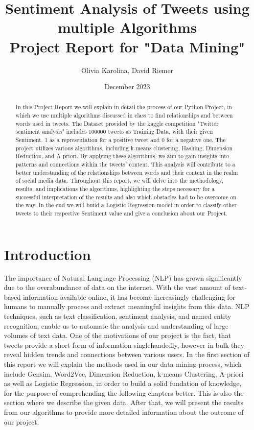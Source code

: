 \documentclass[11pt,a4paper]{article}
\title{Sentiment Analysis of Tweets using multiple Algorithms \\[0.5em] \large{Project Report for "Data Mining" \\[0.5em]} }
\author{Olivia Karolina, David Riemer}
\date{December 2023}
\begin{document}
\maketitle


\newpage
\begin{abstract}
In this Project Report we will explain in detail the process of our Python Project, in which we use multiple algorithms discussed in class to find relationships and between words used in tweets. The Dataset provided by the kaggle competition "Twitter sentiment analysis" includes 100000 tweets as Training Data, with their given Sentiment. 1 as a representation for a positive tweet and 0 for a negative one.
The project utilizes various algorithms, including k-means clustering, Hashing, Dimension Reduction, and A-priori. By applying these algorithms, we aim to gain insights into patterns and connections within the tweets' content. This analysis will contribute to a better understanding of the relationships between words and their context in the realm of social media data. 
Throughout this report, we will delve into the methodology, results, and implications the algorithms, highlighting the steps necessary for a successful interpretation of the results and also which obstacles had to be overcome on the way.
In the end we will build a Logistic Regression-model in order to classify other tweets to their respective Sentiment value and give a conclusion about our Project.
\end{abstract}
\newpage
\tableofcontents
\newpage
\section{Introduction}
The importance of Natural Language Processing (NLP) has grown significantly due to the overabundance of data on the internet. With the vast amount of text-based information available online, it has become increasingly challenging for humans to manually process and extract meaningful insights from this data. NLP techniques, such as text classification, sentiment analysis, and named entity recognition, enable us to automate the analysis and understanding of large volumes of text data. 
One of the motivations of our project is the fact, that tweets provide a short form of information singlehandedly, however in bulk they reveal hidden trends and connections between various users. 
In the first section of this report we will explain the methods used in our data mining process, which include Gensim, Word2Vec, Dimension Reduction, k-means Clustering, A-priori as well as Logistic Regression, in order to build a solid fundation of knowledge, for the purpose of comprehending the following chapters better. This is also the section where we describe the given data. After that, we will present the results from our algorithms to provide more detailed information about the outcome of our project.
\end{document}
